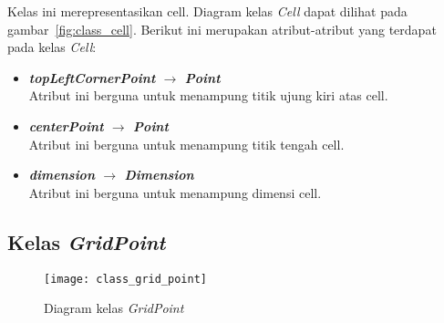 Kelas ini merepresentasikan cell. Diagram kelas \textit{Cell} dapat dilihat pada gambar~\ref{fig:class_cell}. Berikut ini merupakan atribut-atribut yang terdapat pada kelas \textit{Cell}:
\begin{itemize}
	\item \textbf{\textit{topLeftCornerPoint} \(\rightarrow\) \textit{Point}}\\
	Atribut ini berguna untuk menampung titik ujung kiri atas cell.
	\item \textbf{\textit{centerPoint} \(\rightarrow\) \textit{Point}}\\
	Atribut ini berguna untuk menampung titik tengah cell.
	\item \textbf{\textit{dimension} \(\rightarrow\) \textit{Dimension}}\\
	Atribut ini berguna untuk menampung dimensi cell.
\end{itemize}

\subsection{Kelas \textit{GridPoint}}
\begin{figure}[H]
	\centering  
	\texttt{[image: class\_grid\_point]}
	\caption[Diagram kelas \textit{GridPoint}]{Diagram kelas \textit{GridPoint}}
	\label{fig:class_grid_point}
\end{figure}

